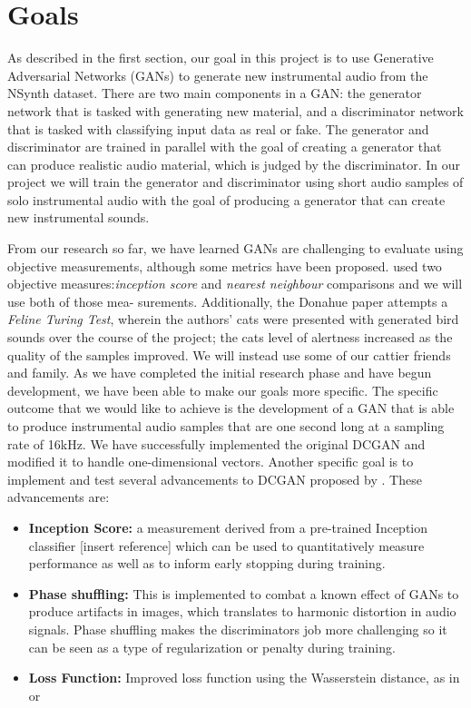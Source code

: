 \documentclass{article} %
\begin{document}
\section{Goals}
As described in the first section, our goal in this project is to use Generative Adversarial Networks (GANs) to generate new instrumental audio from the NSynth dataset. There are two main components in a GAN: the generator network that is tasked with generating new material, and a discriminator network that is tasked with classifying input data as real or fake. The generator and discriminator are trained in parallel with the goal of creating a generator that can produce realistic audio material, which is judged by the discriminator. In our project we will train the generator and discriminator using short audio samples of solo instrumental audio with the goal of producing a generator that can create new instrumental sounds.	

From our research so far, we have learned GANs are challenging to evaluate using objective measurements, although some metrics have been proposed. \citet{donahue2018adversarial} used two objective measures:\emph{inception score} and \emph{nearest neighbour} comparisons and we will use both of those mea- surements. Additionally, the Donahue paper attempts a \emph{Feline Turing Test}, wherein the authors’ cats were presented with generated bird sounds over the course of the project; the cats level of alertness increased as the quality of the samples improved. We will instead use some of our cattier friends and family. 
As we have completed the initial research phase and have begun development, we have been able to make our goals more specific. The specific outcome that we would like to achieve is the development of a GAN that is able to produce instrumental audio samples that are one second long at a sampling rate of 16kHz. We have successfully implemented the original DCGAN and modified it to handle one-dimensional vectors. Another specific goal is to implement and test several advancements to DCGAN proposed by \citet{donahue2018adversarial}. These advancements are:
\begin{itemize}
  \item  \textbf{Inception Score:}  a measurement derived from a pre-trained Inception classifier [insert reference] which can be used to quantitatively measure performance as well as to inform early stopping during training. 
  \item  \textbf{Phase shuffling:} This is implemented to combat a known effect of GANs to produce artifacts in images, which translates to harmonic distortion in audio signals. Phase shuffling makes the discriminators job more challenging so it can be seen as a type of regularization or penalty during training.
  \item \textbf{Loss Function:} Improved loss function using the Wasserstein distance, as in \citet{arjovsky2017wasserstein} or \citet{gulrajani2017improved}
\end{itemize}
\end{document}
